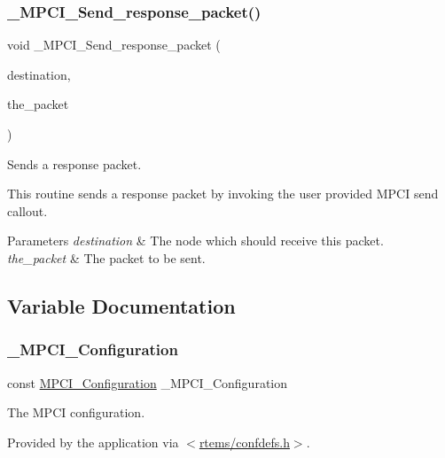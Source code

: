 \subsubsection{\texorpdfstring{\_MPCI\_Send\_response\_packet()}{\_MPCI\_Send\_response\_packet()}}
{\footnotesize\ttfamily void \+\_\+\+M\+P\+C\+I\+\_\+\+Send\+\_\+response\+\_\+packet (\begin{DoxyParamCaption}\item[{uint32\+\_\+t}]{destination,  }\item[{\mbox{\hyperlink{structMP__packet__Prefix}{M\+P\+\_\+packet\+\_\+\+Prefix}} $\ast$}]{the\+\_\+packet }\end{DoxyParamCaption})}



Sends a response packet. 

This routine sends a response packet by invoking the user provided M\+P\+CI send callout.


\begin{DoxyParams}{Parameters}
{\em destination} & The node which should receive this packet. \\
\hline
{\em the\+\_\+packet} & The packet to be sent. \\
\hline
\end{DoxyParams}


\subsection{Variable Documentation}
\mbox{\label{group__RTEMSScoreMPCI_ga311175ff94c266c77baead3ec1c55b01}} 
\subsubsection{\texorpdfstring{\_MPCI\_Configuration}{\_MPCI\_Configuration}}
{\footnotesize\ttfamily const \mbox{\hyperlink{structMPCI__Configuration}{M\+P\+C\+I\+\_\+\+Configuration}} \+\_\+\+M\+P\+C\+I\+\_\+\+Configuration}



The M\+P\+CI configuration. 

Provided by the application via $<$\mbox{\hyperlink{confdefs_8h}{rtems/confdefs.\+h}}$>$. \mbox{\label{group__RTEMSScoreMPCI_ga390b6f48eb63a6879d3c3c2fcb38a4e8}} 
